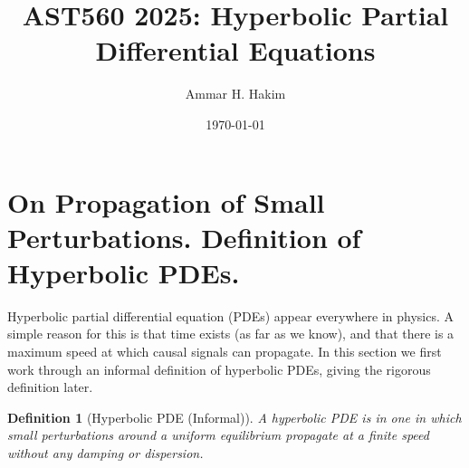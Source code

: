 \documentclass[12pt]{article}
\title{AST560 2025: Hyperbolic Partial Differential Equations}%
\author{Ammar H. Hakim}%
\date{\today}
\newtheorem{definition}{Definition}
\theoremstyle{definition}
\theoremstyle{definition}
\theoremstyle{definition}
\begin{document}
\maketitle

\tableofcontents

\section{On Propagation of Small Perturbations. Definition of
  Hyperbolic PDEs.}

Hyperbolic partial differential equation (PDEs) appear everywhere in
physics. A simple reason for this is that time exists (as far as we
know), and that there is a maximum speed at which causal signals can
propagate. In this section we first work through an informal
definition of hyperbolic PDEs, giving the rigorous definition later.

\begin{definition}[Hyperbolic PDE (Informal)]
  A hyperbolic PDE is in one in which small perturbations around a
  uniform equilibrium propagate at a finite speed without any damping
  or dispersion.
\end{definition}
\end{document}
